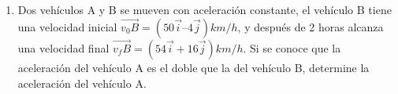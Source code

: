 \begin{enumerate}
\item Dos vehículos A y B se mueven con aceleración
 constante, el vehículo B tiene una velocidad inicial $\vec{v_0B} = (50 
\vec{i} – 4 \vec{j}) km/h$, y después de 2
 horas alcanza una velocidad final $\vec{v_fB}=(54 \vec{i} + 16\vec{j}) km/h$. Si se 
conoce que la aceleración
 del vehículo A es el doble que la del vehículo B, determine la aceleración del vehículo A.



\end{enumerate}
